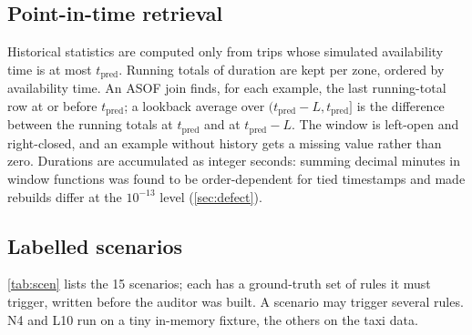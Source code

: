 \documentclass[11pt,a4paper]{article}
\newcommand{\tpred}{$t_{\mathrm{pred}}$}
\begin{document}
\subsection{Point-in-time retrieval}
Historical statistics are computed only from trips whose simulated availability time is at most \tpred{}. Running totals of duration are kept per zone, ordered by availability time. An ASOF join finds, for each example, the last running-total row at or before \tpred{}; a lookback average over $(t_{\mathrm{pred}}-L, t_{\mathrm{pred}}]$ is the difference between the running totals at \tpred{} and at $t_{\mathrm{pred}}-L$. The window is left-open and right-closed, and an example without history gets a missing value rather than zero. Durations are accumulated as integer seconds: summing decimal minutes in window functions was found to be order-dependent for tied timestamps and made rebuilds differ at the $10^{-13}$ level (\autoref{sec:defect}).

\subsection{Labelled scenarios}
\autoref{tab:scen} lists the 15 scenarios; each has a ground-truth set of rules it must trigger, written before the auditor was built. A scenario may trigger several rules. N4 and L10 run on a tiny in-memory fixture, the others on the taxi data.
\end{document}
